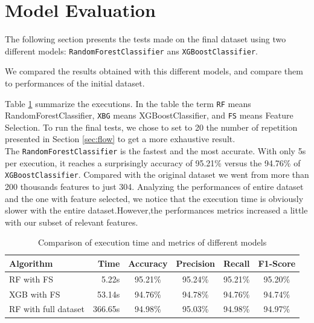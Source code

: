 \section{Model Evaluation}

The following section presents the tests made on the final dataset using two different models: \texttt{RandomForestClassifier} ans \texttt{XGBoostClassifier}.

We compared the results obtained with this different models, and compare them to performances of the initial dataset.

Table \ref{tab:final} summarize the executions. In the table the term \texttt{RF} means RandomForestClassifier, \texttt{XBG} means XGBoostClassifier, and \texttt{FS} means Feature Selection. To run the final tests, we chose to set  to 20 the number of repetition presented in Section \ref{sec:flow} to get a more exhaustive result.\\
The \texttt{RandomForestClassifier} is the fastest and the most accurate. With only 5s per execution, it reaches a surprisingly accuracy of 95.21\% versus the 94.76\% of \texttt{XGBoostClassifier}. Compared with the original dataset we went from more than 200 thousands features to just 304. Analyzing the performances of entire dataset and the one with feature selected, we notice that the execution time is obviously slower with the entire dataset.However,the performances metrics increased a little with our subset of relevant features.

\begin{table}[]
	\centering
	\caption{Comparison of execution time and metrics of different models}
	\label{tab:final}
	\begin{tabular}{lrcccc}
		\toprule
		\textbf{Algorithm}                          & \textbf{Time}    & \textbf{Accuracy} & \textbf{Precision} & \textbf{Recall}  & \textbf{F1-Score} \\
		\midrule
		RF with FS & 5.22s   & 95.21\%  & 95.24\%   & 95.21\% & 95.20\%  \\
		XGB with FS      & 53.14s & 94.76\%  & 94.78\%   & 94.76\% & 94.74\%  \\
		RF with full dataset   &  366.65s  & 94.98\% &       95.03\%    &   94.98\%      & 94.97\%\\
		\bottomrule         
	\end{tabular}
\end{table}